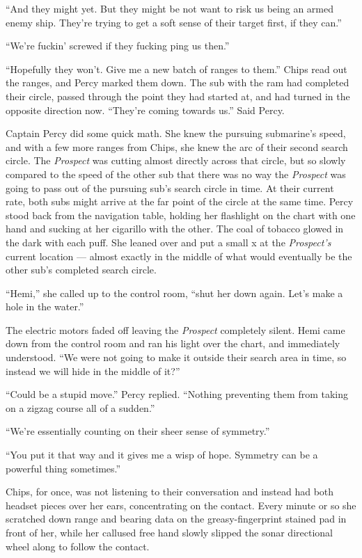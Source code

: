 \documentclass[
]{scrbook}
\begin{document}
``And they might yet. But they might be not want to risk us being an
armed enemy ship. They're trying to get a soft sense of their target
first, if they can.''

``We're fuckin' screwed if they fucking ping us then.''

``Hopefully they won't. Give me a new batch of ranges to them.'' Chips
read out the ranges, and Percy marked them down. The sub with the ram
had completed their circle, passed through the point they had started
at, and had turned in the opposite direction now. ``They're coming
towards us.'' Said Percy.

Captain Percy did some quick math. She knew the pursuing submarine's
speed, and with a few more ranges from Chips, she knew the arc of their
second search circle. The \emph{Prospect} was cutting almost directly
across that circle, but so slowly compared to the speed of the other sub
that there was no way the \emph{Prospect} was going to pass out of the
pursuing sub's search circle in time. At their current rate, both subs
might arrive at the far point of the circle at the same time. Percy
stood back from the navigation table, holding her flashlight on the
chart with one hand and sucking at her cigarillo with the other. The
coal of tobacco glowed in the dark with each puff. She leaned over and
put a small x at the \emph{Prospect's} current location --- almost
exactly in the middle of what would eventually be the other sub's
completed search circle.

``Hemi,'' she called up to the control room, ``shut her down again.
Let's make a hole in the water.''

The electric motors faded off leaving the \emph{Prospect} completely
silent. Hemi came down from the control room and ran his light over the
chart, and immediately understood. ``We were not going to make it
outside their search area in time, so instead we will hide in the middle
of it?''

``Could be a stupid move.'' Percy replied. ``Nothing preventing them
from taking on a zigzag course all of a sudden.''

``We're essentially counting on their sheer sense of symmetry.''

``You put it that way and it gives me a wisp of hope. Symmetry can be a
powerful thing sometimes.''

Chips, for once, was not listening to their conversation and instead had
both headset pieces over her ears, concentrating on the contact. Every
minute or so she scratched down range and bearing data on the
greasy-fingerprint stained pad in front of her, while her callused free
hand slowly slipped the sonar directional wheel along to follow the
contact.
\end{document}
